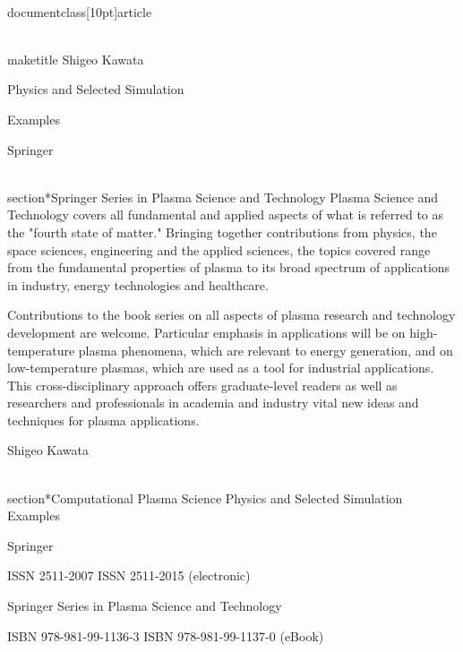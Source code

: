 \\documentclass[10pt]{article}
\begin{document}
\\maketitle
Shigeo Kawata

Physics and Selected Simulation

Examples

Springer

\\section*{Springer Series in Plasma Science and Technology }
Plasma Science and Technology covers all fundamental and applied aspects of what is referred to as the "fourth state of matter." Bringing together contributions from physics, the space sciences, engineering and the applied sciences, the topics covered range from the fundamental properties of plasma to its broad spectrum of applications in industry, energy technologies and healthcare.

Contributions to the book series on all aspects of plasma research and technology development are welcome. Particular emphasis in applications will be on high-temperature plasma phenomena, which are relevant to energy generation, and on low-temperature plasmas, which are used as a tool for industrial applications. This cross-disciplinary approach offers graduate-level readers as well as researchers and professionals in academia and industry vital new ideas and techniques for plasma applications.

Shigeo Kawata

\\section*{Computational Plasma Science}
Physics and Selected Simulation Examples

Springer

ISSN 2511-2007 ISSN 2511-2015 (electronic)

Springer Series in Plasma Science and Technology

ISBN 978-981-99-1136-3 ISBN 978-981-99-1137-0 (eBook)
\end{document}
